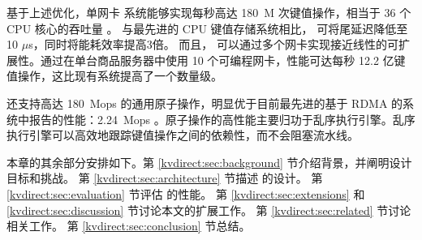 基于上述优化，单网卡 \oursys{} 系统能够实现每秒高达 180~M 次键值操作，相当于 36 个 CPU 核心的吞吐量 \cite {li2016full}。
与最先进的 CPU 键值存储系统相比，\oursys{} 可将尾延迟降低至 10 $\mu$s，同时将能耗效率提高3倍。
而且，\oursys{} 可以通过多个网卡实现接近线性的可扩展性。通过在单台商品服务器中使用 10 个可编程网卡，性能可达每秒 12.2 亿键值操作，这比现有系统提高了一个数量级。

\oursys{} 还支持高达 180~Mops 的通用原子操作，明显优于目前最先进的基于 RDMA 的系统中报告的性能：2.24~Mops \cite {kalia2014using}。原子操作的高性能主要归功于乱序执行引擎。乱序执行引擎可以高效地跟踪键值操作之间的依赖性，而不会阻塞流水线。

本章的其余部分安排如下。第 \ref {kvdirect:sec:background} 节介绍背景，并阐明设计目标和挑战。
第 \ref {kvdirect:sec:architecture} 节描述 \oursys{} 的设计。
第 \ref {kvdirect:sec:evaluation} 节评估 \oursys{} 的性能。
第 \ref {kvdirect:sec:extensions} 和 \ref {kvdirect:sec:discussion} 节讨论本文的扩展工作。
第 \ref {kvdirect:sec:related} 节讨论相关工作。
第 \ref {kvdirect:sec:conclusion} 节总结。
